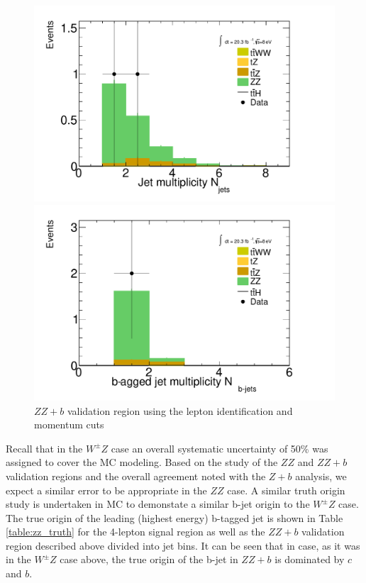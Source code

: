 \begin{figure}[htbp]
  \begin{minipage}[h]{0.5\textwidth}
    \centering \includegraphics[width=\textwidth]{figs/WZ/zz_b_NJet}
  \end{minipage}\hfill
  \begin{minipage}[h]{0.5\textwidth}
    \centering \includegraphics[width=\textwidth]{figs/WZ/zz_b_NJetBTag}
  \end{minipage}\hfill
        \caption{$ZZ+b$ validation region using the \tth lepton identification and momentum cuts }
        \label{figure:background_zz_z_b}
\end{figure}

 
Recall that in the $W^{\pm}Z$ case an overall systematic uncertainty of 50\% was assigned to cover the MC modeling. Based on the study of the $ZZ$ and 
$ZZ+b$ validation regions and the overall agreement noted with the $Z+b$ analysis, we expect a similar error to be appropriate in the $ZZ$ case.  
A similar truth origin study is undertaken in MC to demonstate a similar b-jet origin to the $W^{\pm}Z$ case. The true origin of the leading (highest energy) b-tagged jet is shown in 
Table \ref{table:zz_truth} for the 4-lepton signal region as well as the $ZZ+b$ validation region described above divided into jet bins. It can be seen 
that in case, as it was in the $W^{\pm}Z$ case above, the true origin of the b-jet in $ZZ+b$ is dominated by $c$ and $b$.

